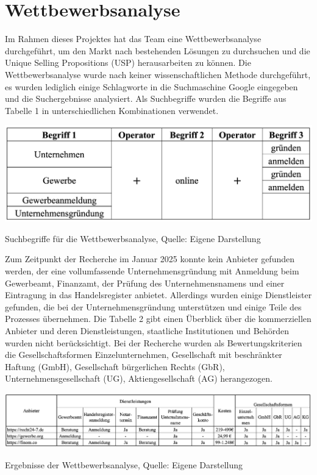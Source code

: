 \newpage

\section{Wettbewerbsanalyse} \label{wettbewerbsanalyse}
Im Rahmen dieses Projektes hat das Team eine Wettbewerbsanalyse durchgeführt, um den Markt nach bestehenden Lösungen zu durchsuchen und die Unique Selling Propositions (USP) herausarbeiten zu können. Die Wettbewerbsanalyse wurde nach keiner wissenschaftlichen Methode durchgeführt, es wurden lediglich einige Schlagworte in die Suchmaschine Google eingegeben und die Suchergebnisse analysiert. Als Suchbegriffe wurden die Begriffe aus Tabelle 1 in unterschiedlichen Kombinationen verwendet. 

\begin{table}[H]
    \includegraphics[width=1\textwidth]{Tabelle 1.png}
    \centering
    \caption{Suchbegriffe für die Wettbewerbsanalyse, Quelle: Eigene Darstellung}
	\label{fig:tabelle1}
\end{table}

Zum Zeitpunkt der Recherche im Januar 2025 konnte kein Anbieter gefunden werden, der eine vollumfassende Unternehmensgründung mit Anmeldung beim Gewerbeamt, Finanzamt, der Prüfung des Unternehmensnamens und einer Eintragung in das Handelsregister anbietet. Allerdings wurden einige Dienstleister gefunden, die bei der Unternehmensgründung unterstützen und einige Teile des Prozesses übernehmen. Die Tabelle 2 gibt einen Überblick über die kommerziellen Anbieter und deren Dienstleistungen, staatliche Institutionen und Behörden wurden nicht berücksichtigt. Bei der Recherche wurden als Bewertungskriterien die Gesellschaftsformen Einzelunternehmen, Gesellschaft mit beschränkter Haftung (GmbH), Gesellschaft bürgerlichen Rechts (GbR), Unternehmensgesellschaft (UG), Aktiengesellschaft (AG) herangezogen.

\begin{table}[H]
    \includegraphics[width=1\textwidth]{Tabelle 2.png}
    \centering
    \caption{Ergebnisse der Wettbewerbsanalyse, Quelle: Eigene Darstellung}
	\label{fig:tabelle2}
\end{table}

